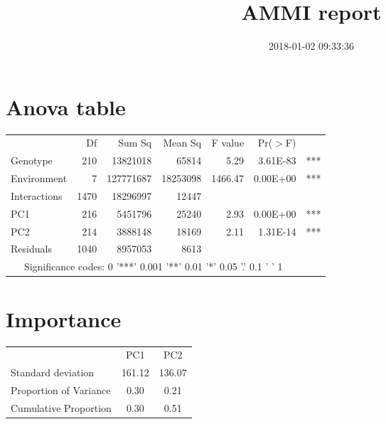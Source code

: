 \documentclass[a4paper,11pt]{article}\usepackage[]{graphicx}\usepackage[]{color}
\title{AMMI report}%
\author{\vspace{-5ex}}
\date{2018-01-02 09:33:36}
\begin{document}


\maketitle
\singlespacing

\section{Anova table}

\begin{table}[ht]
\begin{flushleft}
\begin{tabular}{lrrrrrl}
  & Df & Sum Sq & Mean Sq & F value & Pr($>$F) &  \\ 
 Genotype & 210 & 13821018 & 65814 & 5.29 & 3.61E-83 & *** \\ 
  Environment & 7 & 127771687 & 18253098 & 1466.47 & 0.00E+00 & *** \\ 
  Interactions & 1470 & 18296997 & 12447 &  &  &  \\ 
  PC1 & 216 & 5451796 & 25240 & 2.93 & 0.00E+00 & *** \\ 
  PC2 & 214 & 3888148 & 18169 & 2.11 & 1.31E-14 & *** \\ 
  Residuals & 1040 & 8957053 & 8613 &  &  &  \\ 
   \hline  \multicolumn{6}{c}{Significance codes:  0 '***' 0.001 '**' 0.01 '*' 0.05 '.' 0.1 ' ' 1} \\\end{tabular}
\label{anova}
\end{flushleft}
\end{table}


\section{Importance}

\begin{table}[ht]
\begin{flushleft}
\begin{tabular}{lcc}
  & PC1 & PC2 \\ 
 Standard deviation & 161.12 & 136.07 \\ 
  Proportion of Variance & 0.30 & 0.21 \\ 
  Cumulative Proportion & 0.30 & 0.51 \\ 
  \end{tabular}
\label{importance}
\end{flushleft}
\end{table}
\end{document}
